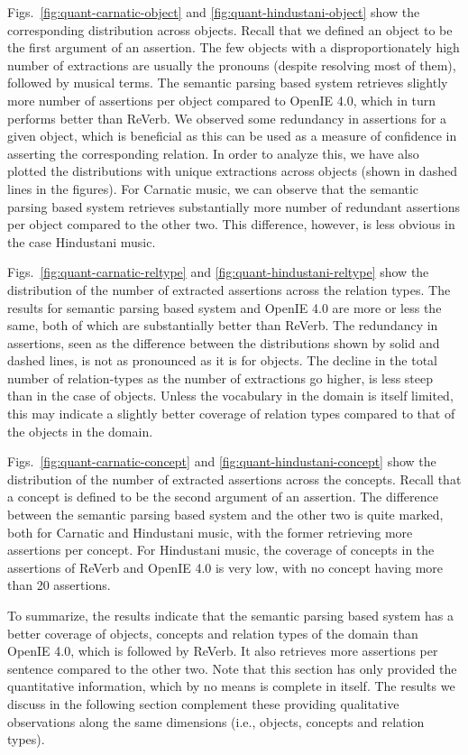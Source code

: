 \documentclass{llncs}
\begin{document}
Figs.~\ref{fig:quant-carnatic-object} and \ref{fig:quant-hindustani-object} show the corresponding distribution across objects. Recall that we defined an object to be the first argument of an assertion. The few objects with a disproportionately high number of extractions are usually the pronouns (despite resolving most of them), followed by musical terms. The semantic parsing based system retrieves slightly more number of assertions per object compared to OpenIE 4.0, which in turn performs better than ReVerb. We observed some redundancy in assertions for a given object, which is beneficial as this can be used as a measure of confidence in asserting the corresponding relation. In order to analyze this, we have also plotted the distributions with unique extractions across objects (shown in dashed lines in the figures). For Carnatic music, we can observe that the semantic parsing based system retrieves substantially more number of redundant assertions per object compared to the other two. This difference, however, is less obvious in the case Hindustani music.

Figs.~\ref{fig:quant-carnatic-reltype} and \ref{fig:quant-hindustani-reltype} show the distribution of the number of extracted assertions across the relation types. The results for semantic parsing based system and OpenIE 4.0 are more or less the same, both of which are substantially better than ReVerb. The redundancy in assertions, seen as the difference between the distributions shown by solid and dashed lines, is not as pronounced as it is for objects. The decline in the total number of relation-types as the number of extractions go higher, is less steep than in the case of objects. Unless the vocabulary in the domain is itself limited, this may indicate a slightly better coverage of relation types compared to that of the objects in the domain.

Figs.~\ref{fig:quant-carnatic-concept} and \ref{fig:quant-hindustani-concept} show the distribution of the number of extracted assertions across the concepts. Recall that a concept is defined to be the second argument of an assertion. The difference between the semantic parsing based system and the other two is quite marked, both for Carnatic and Hindustani music, with the former retrieving more assertions per concept. For Hindustani music, the coverage of concepts in the assertions of ReVerb and OpenIE 4.0 is very low, with no concept having more than 20 assertions.

To summarize, the results indicate that the semantic parsing based system has a better coverage of objects, concepts and relation types of the domain than OpenIE 4.0, which is followed by ReVerb. It also retrieves more assertions per sentence compared to the other two. Note that this section has only provided the quantitative information, which by no means is complete in itself. The results we discuss in the following section complement these providing qualitative observations along the same dimensions (i.e., objects, concepts and relation types).
\end{document}
